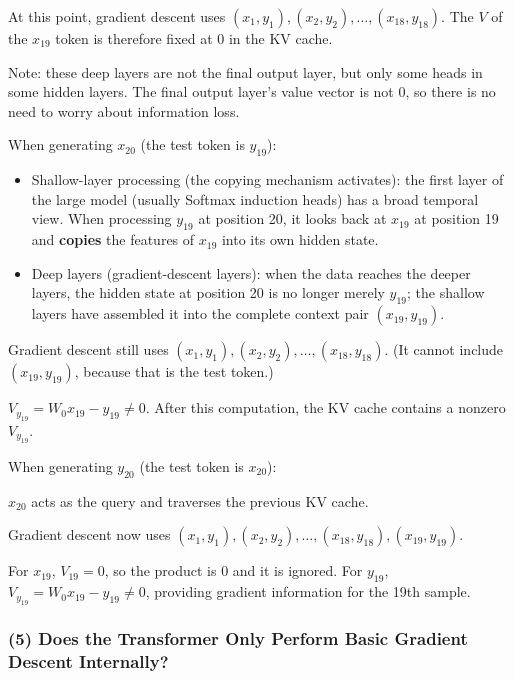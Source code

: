 At this point, gradient descent uses \((x_1,y_1),(x_2,y_2),\ldots,(x_{18},y_{18})\). The \(V\) of the \(x_{19}\) token is therefore fixed at \(0\) in the KV cache.

Note: these deep layers are not the final output layer, but only some heads in some hidden layers. The final output layer's value vector is not 0, so there is no need to worry about information loss.

When generating \(x_{20}\) (the test token is \(y_{19}\)):

\begin{itemize}
\tightlist
\item
  Shallow-layer processing (the copying mechanism activates): the first layer of the large model (usually Softmax induction heads) has a broad temporal view. When processing \(y_{19}\) at position 20, it looks back at \(x_{19}\) at position 19 and \textbf{copies} the features of \(x_{19}\) into its own hidden state.
\item
  Deep layers (gradient-descent layers): when the data reaches the deeper layers, the hidden state at position 20 is no longer merely \(y_{19}\); the shallow layers have assembled it into the complete context pair \((x_{19},y_{19})\).
\end{itemize}

Gradient descent still uses \((x_1,y_1),(x_2,y_2),\ldots,(x_{18},y_{18})\). (It cannot include \((x_{19},y_{19})\), because that is the test token.)

\(V_{y_{19}}=W_0x_{19}-y_{19}\ne 0\). After this computation, the KV cache contains a nonzero \(V_{y_{19}}\).

When generating \(y_{20}\) (the test token is \(x_{20}\)):

\(x_{20}\) acts as the query and traverses the previous KV cache.

Gradient descent now uses \((x_1,y_1),(x_2,y_2),\ldots,(x_{18},y_{18}),(x_{19},y_{19})\).

For \(x_{19}\), \(V_{19}=0\), so the product is \(0\) and it is ignored. For \(y_{19}\), \(V_{y_{19}}=W_0x_{19}-y_{19}\ne 0\), providing gradient information for the 19th sample.

\hypertarget{does-the-transformer-only-perform-basic-gradient-descent-internally}{%
\subsubsection{(5) Does the Transformer Only Perform Basic Gradient Descent Internally?}\label{does-the-transformer-only-perform-basic-gradient-descent-internally}}

